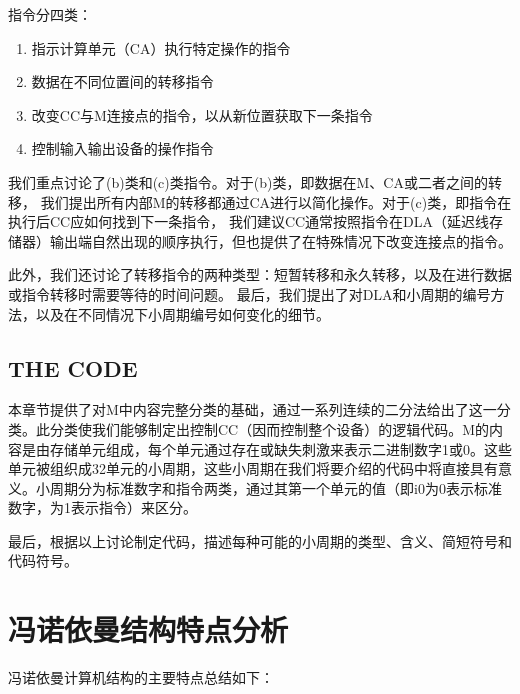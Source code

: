 \documentclass[12pt]{article} %
\theoremstyle{definition}
\begin{document}
指令分四类：
\begin{enumerate}
  \item 指示计算单元（CA）执行特定操作的指令
  \item 数据在不同位置间的转移指令
  \item 改变CC与M连接点的指令，以从新位置获取下一条指令
  \item 控制输入输出设备的操作指令
\end{enumerate}

我们重点讨论了(b)类和(c)类指令。对于(b)类，即数据在M、CA或二者之间的转移，
我们提出所有内部M的转移都通过CA进行以简化操作。对于(c)类，即指令在执行后CC应如何找到下一条指令，
我们建议CC通常按照指令在DLA（延迟线存储器）输出端自然出现的顺序执行，但也提供了在特殊情况下改变连接点的指令。

此外，我们还讨论了转移指令的两种类型：短暂转移和永久转移，以及在进行数据或指令转移时需要等待的时间问题。
最后，我们提出了对DLA和小周期的编号方法，以及在不同情况下小周期编号如何变化的细节。

\subsection{THE CODE}

本章节提供了对M中内容完整分类的基础，通过一系列连续的二分法给出了这一分类。此分类使我们能够制定出控制CC（因而控制整个设备）的逻辑代码。M的内容是由存储单元组成，每个单元通过存在或缺失刺激来表示二进制数字1或0。这些单元被组织成32单元的小周期，这些小周期在我们将要介绍的代码中将直接具有意义。小周期分为标准数字和指令两类，通过其第一个单元的值（即i0为0表示标准数字，为1表示指令）来区分。

最后，根据以上讨论制定代码，描述每种可能的小周期的类型、含义、简短符号和代码符号。

\section{冯诺依曼结构特点分析}

冯诺依曼计算机结构的主要特点总结如下\cite{vonNeumann1945edvac}：
\end{document}
